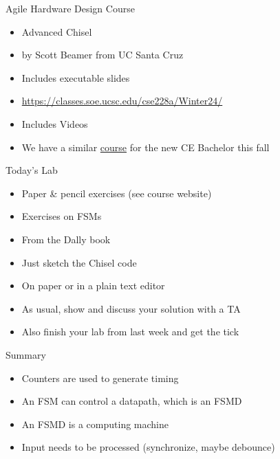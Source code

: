 \begin{frame}[fragile]{Agile Hardware Design Course}
\begin{itemize}
\item Advanced Chisel
\item by Scott Beamer from UC Santa Cruz
\item Includes executable slides
\item \url{https://classes.soe.ucsc.edu/cse228a/Winter24/}
\item Includes Videos
\item We have a similar \href{https://kurser.dtu.dk/course/02201}{course} for the new CE Bachelor this fall
\end{itemize}
\end{frame}

\begin{frame}[fragile]{Today's Lab}
\begin{itemize}
\item Paper \& pencil exercises (see course website)
\item Exercises on FSMs
\item From the Dally book
\item Just sketch the Chisel code
\item On paper or in a plain text editor
\item As usual, show and discuss your solution with a TA
\item Also finish your lab from last week and get the tick
\end{itemize}
\end{frame}

\begin{frame}[fragile]{Summary}
\begin{itemize}
\item Counters are used to generate timing
\item An FSM can control a datapath, which is an FSMD
\item An FSMD is a computing machine
\item Input needs to be processed (synchronize, maybe debounce)
\end{itemize}
\end{frame}




